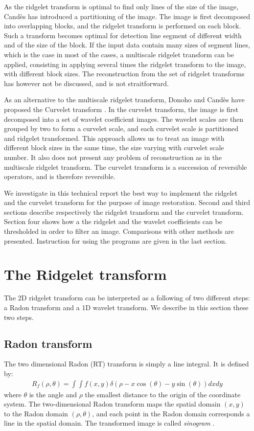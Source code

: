 \documentclass[11pt,a4paper]{article}
\begin{document}
 As the ridgelet transform is optimal to find only lines of the size of the image,
Cand\`es \cite{cur:candes98} has introduced a partitioning of the image.
The image is first decomposed into overlapping blocks, and the 
ridgelet transform is performed on each block. Such a transform becomes
optimal for detection line  segment of different width
and  of the size of the block. If the input data contain many sizes of
segment lines, which is the case in most of the cases, a multiscale 
ridgelet transform can be applied, consisting in applying 
several times the ridgelet 
transform to the image, with different block sizes. The reconstruction
from the set of ridgelet transforms has however not be discussed, and 
is not straitforward.

As an alternative to the multiscale ridgelet transform, Donoho  and 
Cand\`es have proposed the Curvelet transform 
\cite{cur:candes99_3,cur:donoho99}. In the curvelet transform, the 
image is first decomposed into a set of wavelet coefficient images.
The wavelet scales are then grouped by two to form a curvelet scale, 
and each curvelet scale is partitioned and ridgelet transformed.
This approach allows us to treat an image with different block sizes
in the same time, the size varying with curvelet scale number. 
It also does not present any problem of reconstruction as in the
multiscale ridgelet transform. The curvelet transform is a succession
of reversible operators, and is therefore reversible.


We investigate in this technical report the best way to implement 
the ridgelet and the curvelet transform for the purpose of image restoration.
Second and third sections describe respectively
the ridgelet transform and the curvelet transform.
Section four shows how a the ridgelet and the wavelet coefficients can be
thresholded in order to filter an image. Comparisons with other methods
are presented. Instruction for using the programs are given in the last 
section.

\section{The Ridgelet transform}
 
The 2D ridgelet transform can be interpreted as a following of two
different steps: a Radon transform and a 1D wavelet 
transform. We describe in this section these two steps.

\subsection{Radon transform}
The two dimensional Radon (RT) transform is simply a line integral. It 
is defined by:
\begin{eqnarray}
R_f(\rho, \theta) = \int \int f(x,y) 
     \delta (\rho - x \cos ( \theta ) - y \sin ( \theta) ) dx dy
\end{eqnarray}
where $\theta$ is the angle and $\rho$
the smallest distance to the origin of the coordinate system. The
two-dimensional Radon transform maps the spatial domain $(x,y)$ to
the Radon domain $(\rho, \theta)$, and each point in the Radon domain
corresponds a line in the spatial domain. The transformed image is 
called {\em sinogram} \cite{ima:liang00}.
\end{document}
